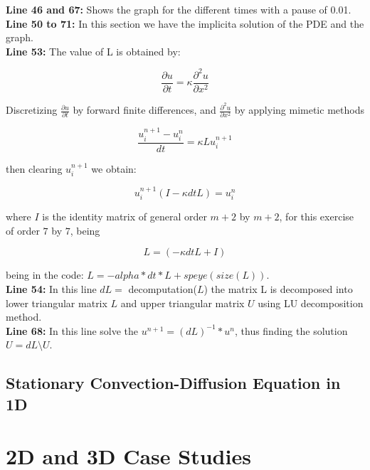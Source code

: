 \textbf{Line 46 and 67:} Shows the graph for the different times with a pause of 0.01. \\


\textbf{Line 50 to 71:} In this section we have the implicita solution of the PDE and the graph. \\

\textbf{Line 53:} The value of L is obtained by:

\begin{equation}
    \frac{\partial u}{\partial t} = \kappa \frac{\partial^{2} u}{\partial x^{2}}
\end{equation}

Discretizing $\frac{\partial u}{\partial t}$ by forward finite differences, and $\frac{\partial^{2} u}{\partial x^{2}}$ by applying mimetic methods

\begin{equation}
    \frac{u^{n+1}_{i} - u^{n}_{i} }{dt} = \kappa L 	u^{n+1}_{i}
\end{equation}

then clearing $u^{n+1}_{i}$ we obtain:


\begin{equation}
    u^{n+1}_{i}(I - \kappa dt L ) = u^{n}_{i}
\end{equation}

where $I$ is the identity matrix of general order $m+2$ by $m+2$, for this exercise of order $7$ by $7$, being

$$  L = (-\kappa dt L + I)$$

being in the code: $ L = -alpha*dt*L +speye(size(L))$.\\

\textbf{Line 54:} In this line $dL=$ decomputation($L$) the matrix L is decomposed into lower triangular matrix $L$ and upper triangular matrix $U$ using LU decomposition method.\\

\textbf{Line 68:} In this line solve the $u^{n+1} =(dL)^{-1}*u^{n}$, thus finding the solution $U=dL \setminus U$.\\

\section{Stationary Convection-Diffusion Equation in 1D}

\chapter{2D and 3D Case Studies}


